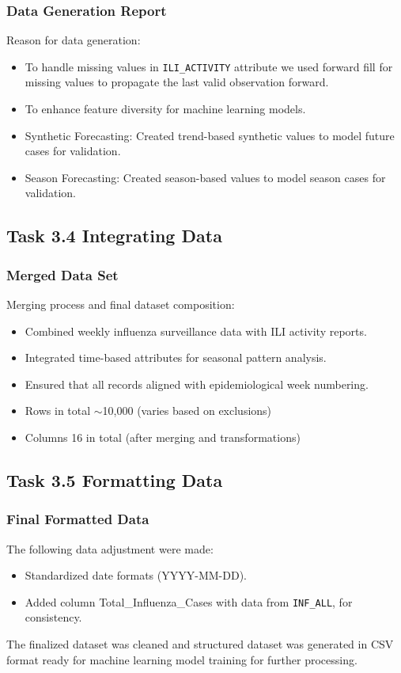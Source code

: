 \subsubsection*{Data Generation Report}

Reason for data generation:
\begin{itemize}
  \item To handle missing values in \texttt{ILI\_ACTIVITY} attribute we used forward fill for missing values to propagate the last valid observation forward.
  \item To enhance feature diversity for machine learning models.
  \item Synthetic Forecasting: Created trend-based synthetic values to model future cases for validation.
  \item Season Forecasting: Created season-based values to model season cases for validation.
\end{itemize}

\subsection*{Task 3.4 Integrating Data}

\subsubsection*{Merged Data Set}

Merging process and final dataset composition:
\begin{itemize}
  \item Combined weekly influenza surveillance data with ILI activity reports.
  \item Integrated time-based attributes for seasonal pattern analysis.
  \item Ensured that all records aligned with epidemiological week numbering.
  \item Rows in total \(\sim\)10,000 (varies based on exclusions)
  \item Columns 16 in total (after merging and transformations)
\end{itemize}

\subsection*{Task 3.5 Formatting Data}

\subsubsection*{Final Formatted Data}

The following data adjustment were made:
\begin{itemize}
  \item Standardized date formats (YYYY-MM-DD).
  \item Added column Total\_Influenza\_Cases with data from \texttt{INF\_ALL}, for consistency.
\end{itemize}

The finalized dataset was cleaned and structured dataset was generated in CSV format ready for machine learning model training for further processing.
